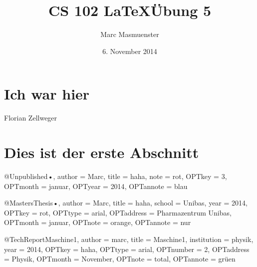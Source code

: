 \documentclass{article}
\author{Marc Masmuenster}
\title{CS 102 \LaTeX  \"Ubung 5}
\date{6. November 2014}
\begin{document}
\maketitle
\section{Ich war hier}
Florian Zellweger
\section{Dies ist der erste Abschnitt}

@Unpublished{•,
author = {Marc},
title = {haha},
note = {rot},
OPTkey = {3},
OPTmonth = {januar},
OPTyear = {2014},
OPTannote = {blau}
}



@MastersThesis{•,
author = {Marc},
title = {haha},
school = {Unibas},
year = {2014},
OPTkey = {rot},
OPTtype = {arial},
OPTaddress = {Pharmazentrum Unibas},
OPTmonth = {januar},
OPTnote = {orange},
OPTannote = {nur}
}

@TechReport{Maschine1,
author = {marc},
title = {Maschine1},
institution = {physik},
year = {2014},
OPTkey = {haha},
OPTtype = {arial},
OPTnumber = {2},
OPTaddress = {Physik},
OPTmonth = {November},
OPTnote = {total},
OPTannote = {grüen}
}
\end{document}
